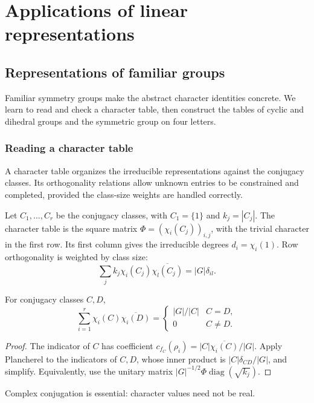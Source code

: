 \chapter{Applications of linear representations}
\label{chap-applications-linear-representations}

\section{Representations of familiar groups}

Familiar symmetry groups make the abstract character identities concrete. We
learn to read and check a character table, then construct the tables of
cyclic and dihedral groups and the symmetric group on four letters.

\subsection{Reading a character table}

A character table organizes the irreducible representations against the
conjugacy classes. Its orthogonality relations allow unknown entries to be
constrained and completed, provided the class-size weights are handled
correctly.

Let $C_1,\ldots,C_r$ be the conjugacy classes, with $C_1=\{1\}$ and
$k_j=|C_j|$. The character table is the square matrix
$\Phi=(\chi_i(C_j))_{i,j}$, with the trivial character in the first row.
Its first column gives the irreducible degrees $d_i=\chi_i(1)$.
Row orthogonality is weighted by class size:
\[
 \sum_j k_j\chi_i(C_j)\overline{\chi_l(C_j)}=|G|\delta_{il}.
\]


\begin{prop}
\label{prop-orthogonalite-columns}
For conjugacy classes $C,D$,
\[
 \sum_{i=1}^r\chi_i(C)\overline{\chi_i(D)}
   =\begin{cases}|G|/|C|&C=D,\\0&C\ne D.\end{cases}
\]
\end{prop}
\begin{proof}
The indicator of $C$ has coefficient
$c_{f_C}(\rho_i)=|C|\overline{\chi_i(C)}/|G|$.
Apply Plancherel to the indicators of $C,D$, whose inner product is
$|C|\delta_{CD}/|G|$, and simplify. Equivalently, use the unitary matrix
$|G|^{-1/2}\Phi\operatorname{diag}(\sqrt{k_j})$.
\end{proof}
Complex conjugation is essential: character values need not be real.

